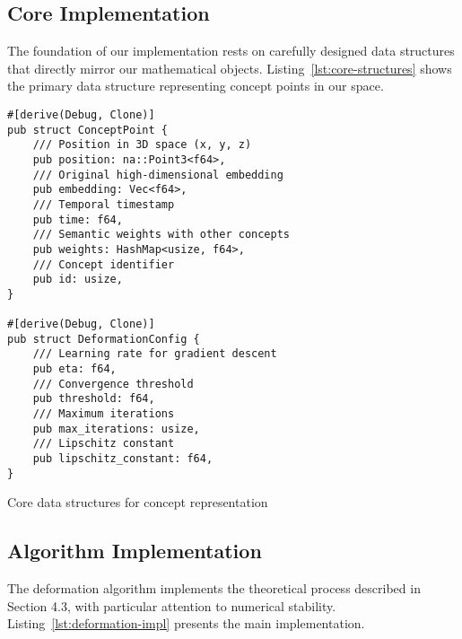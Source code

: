 \documentclass{article}
\begin{document}
\subsection{Core Implementation}
The foundation of our implementation rests on carefully designed data structures that directly mirror our mathematical objects. Listing~\ref{lst:core-structures} shows the primary data structure representing concept points in our space.

\begin{listing}[h]
\begin{verbatim}
#[derive(Debug, Clone)]
pub struct ConceptPoint {
    /// Position in 3D space (x, y, z)
    pub position: na::Point3<f64>,
    /// Original high-dimensional embedding
    pub embedding: Vec<f64>,
    /// Temporal timestamp
    pub time: f64,
    /// Semantic weights with other concepts
    pub weights: HashMap<usize, f64>,
    /// Concept identifier
    pub id: usize,
}

#[derive(Debug, Clone)]
pub struct DeformationConfig {
    /// Learning rate for gradient descent
    pub eta: f64,
    /// Convergence threshold
    pub threshold: f64,
    /// Maximum iterations
    pub max_iterations: usize,
    /// Lipschitz constant
    pub lipschitz_constant: f64,
}
\end{verbatim}
\caption{Core data structures for concept representation}
\label{lst:core-structures}
\end{listing}

\subsection{Algorithm Implementation}
The deformation algorithm implements the theoretical process described in Section 4.3, with particular attention to numerical stability. Listing~\ref{lst:deformation-impl} presents the main implementation.
\end{document}
